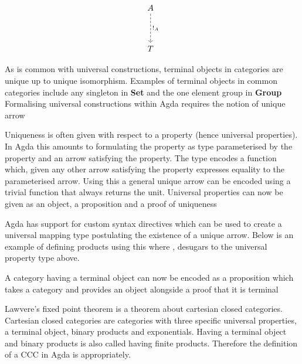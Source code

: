 \[\begin{tikzcd}[sep=huge]
A \arrow[d, "!_A", dashed] \\
T
\end{tikzcd}\]

As is common with universal constructions, terminal objects in categories are
unique up to unique isomorphism. Examples of terminal objects in common
categories include any singleton in \textbf{Set} and the one element group in
\textbf{Group} Formalising universal constructions within Agda requires the
notion of unique arrow


Uniqueness is often given with respect to a property (hence universal
properties). In Agda this amounts to formulating the property as type
parameterised by the property and an arrow satisfying the property. The type
encodes a function which, given any other arrow satisfying the property
expresses equality to the parameterised arrow. Using this a general unique arrow
can be encoded using a trivial function that always returns the unit. Universal
properties can now be given as an object, a proposition and a proof of
uniqueness


Agda has support for custom syntax directives which can be used to create a
universal mapping type postulating the existence of a unique arrow. Below is an
example of defining products using this where , desugars to
the universal property type above.


A category having a terminal object can now be encoded as a proposition which
takes a category and provides an object alongside a proof that it is terminal


Lawvere's fixed point theorem is a theorem about cartesian closed categories.
Cartesian closed categories are categories with three specific universal
properties, a terminal object, binary products and exponentials. Having a terminal
object and binary products is also called having finite products. Therefore the
definition of a CCC in Agda is appropriately.


